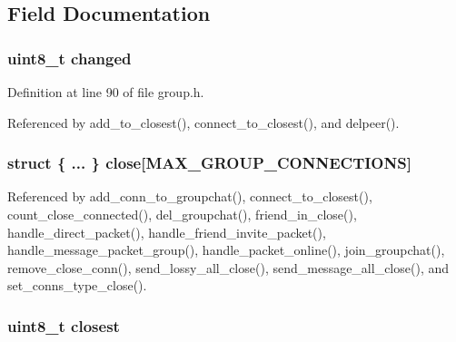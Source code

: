 \subsection{Field Documentation}
\hypertarget{struct_group__c_aab3e81d63c7e7e9e693aa0f5fb574fa4}{
\subsubsection[{changed}]{\setlength{\rightskip}{0pt plus 5cm}uint8\+\_\+t changed}}\label{struct_group__c_aab3e81d63c7e7e9e693aa0f5fb574fa4}


Definition at line 90 of file group.\+h.



Referenced by add\+\_\+to\+\_\+closest(), connect\+\_\+to\+\_\+closest(), and delpeer().

\hypertarget{struct_group__c_a6c24608383f70ad37f70307f492e3abc}{
\subsubsection[{close}]{\setlength{\rightskip}{0pt plus 5cm}struct \{ ... \}   close\mbox{[}{\bf M\+A\+X\+\_\+\+G\+R\+O\+U\+P\+\_\+\+C\+O\+N\+N\+E\+C\+T\+I\+O\+N\+S}\mbox{]}}}\label{struct_group__c_a6c24608383f70ad37f70307f492e3abc}


Referenced by add\+\_\+conn\+\_\+to\+\_\+groupchat(), connect\+\_\+to\+\_\+closest(), count\+\_\+close\+\_\+connected(), del\+\_\+groupchat(), friend\+\_\+in\+\_\+close(), handle\+\_\+direct\+\_\+packet(), handle\+\_\+friend\+\_\+invite\+\_\+packet(), handle\+\_\+message\+\_\+packet\+\_\+group(), handle\+\_\+packet\+\_\+online(), join\+\_\+groupchat(), remove\+\_\+close\+\_\+conn(), send\+\_\+lossy\+\_\+all\+\_\+close(), send\+\_\+message\+\_\+all\+\_\+close(), and set\+\_\+conns\+\_\+type\+\_\+close().

\hypertarget{struct_group__c_a8ff1adca518d82728e7d450f6d14e8db}{
\subsubsection[{closest}]{\setlength{\rightskip}{0pt plus 5cm}uint8\+\_\+t closest}}\label{struct_group__c_a8ff1adca518d82728e7d450f6d14e8db}


